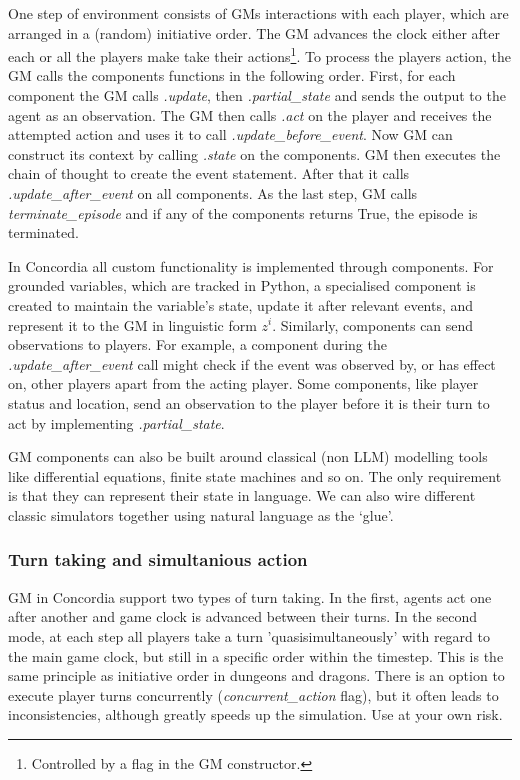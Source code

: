 \documentclass[11pt, a4paper, logo, twocolumn, internal, copyright, numbering]{googledeepmind}
\begin{document}
One step of environment consists of GMs interactions with each player, which are arranged in a (random) initiative order. The GM advances the clock either after each or all the players make take their actions\footnote{Controlled by a flag in the GM constructor.}. To process the players action, the GM calls the components functions in the following order. First, for each component the GM calls \textit{.update}, then \textit{.partial\_state} and sends the output to the agent as an observation. The GM then calls \textit{.act} on the player and receives the attempted action and uses it to call \textit{.update\_before\_event}. 
Now GM can construct its context by calling \textit{.state} on the components. GM then executes the chain of thought to create the event statement. After that it calls \textit{.update\_after\_event} on all components. As the last step, GM calls \textit{terminate\_episode} and if any of the components returns True, the episode is terminated.

In Concordia all custom functionality is implemented through components. For grounded variables, which are tracked in Python, a specialised component is created to maintain the variable's state, update it after relevant events, and represent it to the GM in linguistic form $z^i$. Similarly,  components can send observations to players. For example, a component during the \textit{.update\_after\_event} call might check if the event was observed by, or has effect on, other players apart from the acting player. Some components, like player status and location, send an observation to the player before it is their turn to act by implementing \textit{.partial\_state}.

GM components can also be built around classical (non LLM) modelling tools like differential equations, finite state machines and so on. The only requirement is that they can represent their state in language. We can also wire different classic simulators together using natural language as the `glue'. 

\subsubsection{Turn taking and simultanious action}
GM in Concordia support two types of turn taking. In the first, agents act one after another and game clock is advanced between their turns. In the second mode, at each step all players take a turn 'quasisimultaneously' with regard to the main game clock, but still in a specific order within the timestep. This is the same principle as initiative order in dungeons and dragons. There is an option to execute player turns concurrently (\textit{concurrent\_action} flag), but it often leads to inconsistencies, although greatly speeds up the simulation. Use at your own risk.
\end{document}
